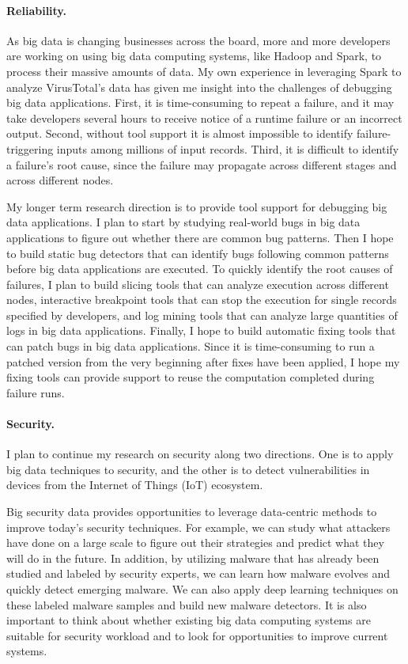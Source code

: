 \documentclass[10pt]{article}
\begin{document}
\paragraph{Reliability.} 
As big data is changing businesses across the board, 
more and more developers are working on using big data computing systems, 
like Hadoop and Spark, to process their massive amounts of data. 
My own experience in leveraging Spark to analyze VirusTotal's data 
has given me insight into the challenges of debugging big data applications. 
First, it is time-consuming to repeat a failure, and it may take developers several hours to receive notice of a runtime failure or an incorrect output.
Second, without tool support it is almost impossible to identify failure-triggering inputs among millions of input records. 
Third, it is difficult to identify a failure's root cause, since the failure may propagate across different stages and across different nodes.

My longer term research direction is to provide tool support for debugging big data applications.
I plan to start by studying real-world bugs in big data applications to figure out whether there are common bug patterns. 
Then I hope to build static bug detectors that can identify bugs following common patterns before big data applications are executed.  
To quickly identify the root causes of failures, I plan to build slicing tools that can analyze execution across different nodes, 
interactive breakpoint tools that can stop the execution for single records specified by developers,
and log mining tools that can analyze large quantities of logs in big data applications.
Finally, I hope to build automatic fixing tools that can patch bugs in big data applications.
Since it is time-consuming to run a patched version from the very beginning after fixes have been applied, 
I hope my fixing tools can provide support to reuse the computation completed during failure runs.  


\vspace{-.1in}
\paragraph{Security.} 

I plan to continue my research on security along two directions. 
One is to apply big data techniques to security, 
and the other is to detect vulnerabilities in devices from the Internet of Things (IoT) ecosystem.

Big security data provides opportunities to leverage data-centric methods to improve today's security techniques. 
For example, we can study what attackers have done on a large scale to figure out their strategies and predict what they will do in the future. 
In addition, by utilizing malware that has already been studied and labeled by security experts, 
we can learn how malware evolves and quickly detect emerging malware. 
We can also apply deep learning techniques on these labeled malware samples and build new malware detectors. 
It is also important to think about whether existing big data computing systems are suitable for security workload
and to look for opportunities to improve current systems.
\end{document}

